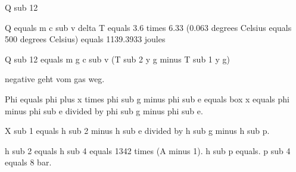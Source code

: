Q sub 12

Q equals m c sub v delta T equals 3.6 times 6.33 (0.063 degrees Celsius equals 500 degrees Celsius) equals 1139.3933 joules

Q sub 12 equals m g c sub v (T sub 2 y g minus T sub 1 y g)

negative geht vom gas weg.

Phi equals phi plus x times phi sub g minus phi sub e equals box x equals phi minus phi sub e divided by phi sub g minus phi sub e.

X sub 1 equals h sub 2 minus h sub e divided by h sub g minus h sub p.

h sub 2 equals h sub 4 equals 1342 times (A minus 1). h sub p equals. p sub 4 equals 8 bar.